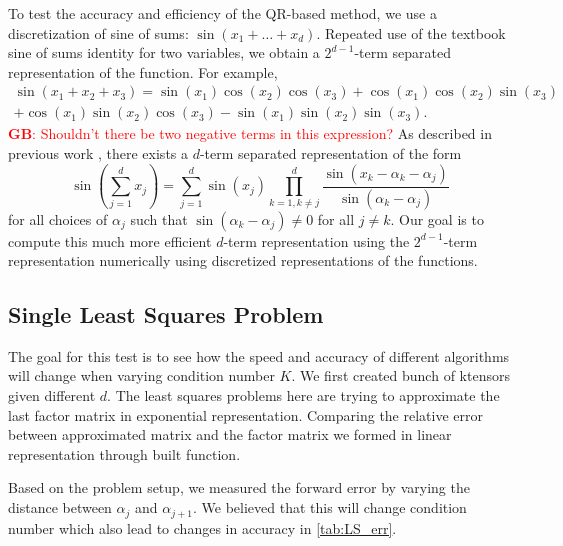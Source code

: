 \documentclass{article}
\newcommand{\T}[2][]{#1{\mathbf{\cal{#2}}}} 						%
\newcommand{\GB}[1]{\textcolor{red}{\textbf{GB}: #1}}
\begin{document}
To test the accuracy and efficiency of the QR-based method, we use a discretization of sine of sums: $\sin(x_1+\dots+ x_d)$.
Repeated use of the textbook sine of sums identity for two variables, we obtain a $2^{d-1}$-term separated representation of the function.
For example, 
\begin{equation*}
\begin{split}
\sin(x_1+x_2+x_3) = \sin(x_1)\cos(x_2)\cos(x_3)+\cos(x_1)\cos(x_2)\sin(x_3) \\
+\cos(x_1)\sin(x_2)\cos(x_3) - \sin(x_1)\sin(x_2)\sin(x_3).
\end{split}
\end{equation*}
\GB{Shouldn't there be two negative terms in this expression?}
As described in previous work \cite{BM02,MVLB23}, there exists a $d$-term separated representation of the form
$$\sin\left(\sum^d_{j=1}x_j\right) = \sum^d_{j=1}\sin(x_j)\prod^d_{k=1,k\neq j}\frac{\sin(x_k - \alpha_k -\alpha_j)}{\sin(\alpha_k - \alpha_j)}$$
for all choices of  ${\alpha_j}$ such that $\sin(\alpha_k - \alpha_j) \neq 0$ for all $j \neq k$.
Our goal is to compute this much more efficient $d$-term representation using the $2^{d-1}$-term representation numerically using discretized representations of the functions.

\subsection{Single Least Squares Problem}


The goal for this test is to see how the speed and accuracy of different algorithms will change when varying condition number $K$.
We first created bunch of ktensors given different $d$. The least squares problems here are trying to approximate the last factor matrix in exponential representation. Comparing the relative error between approximated matrix and the factor matrix we formed in linear representation through built function. 

Based on the problem setup, we measured the forward error by varying the distance between $\alpha_j$ and $\alpha_{j+1}$.
We believed that this will change condition number which also lead to changes in accuracy in \cref{tab:LS_err}. 
\end{document}

